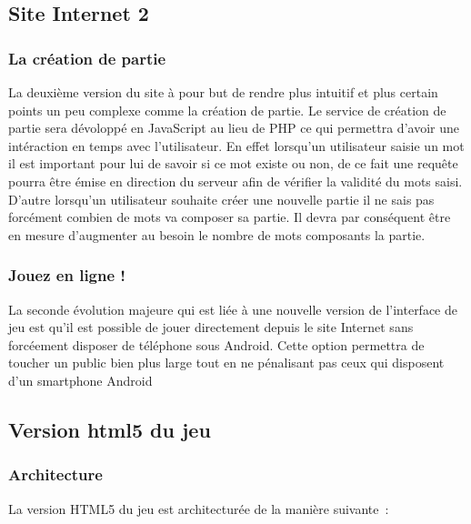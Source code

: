 \documentclass[a4paper,11pt,french]{article}
\def\android{Android\texttrademark{}}
\begin{document}
{\subsection{Site Internet 2}
\subsubsection{La création de partie}
La deuxième version du site à pour but de rendre plus intuitif et plus certain points un peu complexe comme la création de partie.
Le service de création de partie sera dévoloppé en JavaScript au lieu de PHP ce qui permettra d'avoir une intéraction en temps avec l'utilisateur.
En effet lorsqu'un utilisateur saisie un mot il est important pour lui de savoir si ce mot existe ou non, de ce fait une requête pourra être
émise en direction du serveur afin de vérifier la validité du mots saisi. D'autre lorsqu'un utilisateur souhaite créer une nouvelle partie 
il ne sais pas forcément combien de mots va composer sa partie. Il devra par conséquent être en mesure d'augmenter au besoin le nombre de mots
composants la partie.

\subsubsection{Jouez en ligne !}
La seconde évolution majeure qui est liée à une nouvelle version de l'interface de jeu est qu'il est possible de jouer directement depuis
le site Internet sans forcéement disposer de téléphone sous \android{}. Cette option permettra de toucher un public bien plus large tout en 
ne pénalisant pas ceux qui disposent d'un smartphone \android{}


\subsection{Version html5 du jeu}
\label{sec:html5}
\subsubsection{Architecture}

La version HTML5 du jeu est architecturée de la manière suivante~:

}
\end{document}
